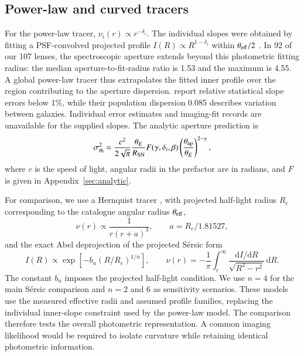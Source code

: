 \documentclass{aa}
\begin{document}
\subsection{Power-law and curved tracers}\label{sec:tracers}
For the power-law tracer, $\nu_i(r)\propto r^{-\delta_i}$. The individual slopes were obtained by fitting a PSF-convolved projected profile $I(R)\propto R^{1-\delta_i}$ within $\theta_{\rm eff}/2$ \citep{stz1902}. In 92 of our 107 lenses, the spectroscopic aperture extends beyond this photometric fitting radius: the median aperture-to-fit-radius ratio is 1.53 and the maximum is 4.55. A global power-law tracer thus extrapolates the fitted inner profile over the region contributing to the aperture dispersion. \citet{stz1902} report relative statistical slope errors below 1\%, while their population dispersion 0.085 describes variation between galaxies. Individual error estimates and imaging-fit records are unavailable for the supplied slopes. The analytic aperture prediction is
\begin{equation}\label{eq:sigma_th}
\sigma_{\rm th}^2=\frac{c^2}{2\sqrt\pi}\frac{\theta_E}{R_{\rm SN}}
 F(\gamma,\delta_i,\beta)\left(\frac{\theta_{\rm ap}}{\theta_E}\right)^{2-\gamma},
\end{equation}
where $c$ is the speed of light, angular radii in the prefactor are in radians, and $F$ is given in Appendix~\ref{sec:analytic}.

For comparison, we use a Hernquist tracer \citep{Hernquist1990}, with projected half-light radius $R_e$ corresponding to the catalogue angular radius $\theta_{\rm eff}$,
\begin{equation}
\nu(r)\propto\frac{1}{r(r+a)^3},\qquad a=R_e/1.81527,
\end{equation}
and the exact Abel deprojection of the projected S\'ersic form
\begin{equation}
I(R)\propto\exp[-b_n(R/R_e)^{1/n}],\qquad
\nu(r)=-\frac1\pi\int_r^\infty\frac{\mathrm d I/\mathrm d R}{\sqrt{R^2-r^2}}\,\mathrm dR.
\end{equation}
The constant $b_n$ imposes the projected half-light condition. We use $n=4$ for the main S\'ersic comparison and $n=2$ and 6 as sensitivity scenarios. These models use the measured effective radii and assumed profile families, replacing the individual inner-slope constraint used by the power-law model. The comparison therefore tests the overall photometric representation. A common imaging likelihood would be required to isolate curvature while retaining identical photometric information.
\end{document}
